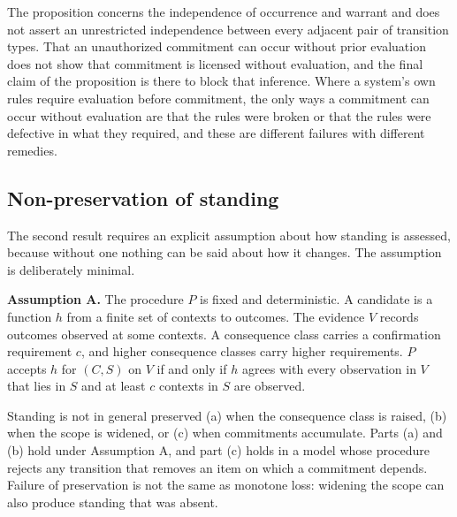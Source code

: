 The proposition concerns the independence of occurrence and warrant and does not assert an unrestricted independence between every adjacent pair of transition types. That an unauthorized commitment can occur without prior evaluation does not show that commitment is licensed without evaluation, and the final claim of the proposition is there to block that inference. Where a system's own rules require evaluation before commitment, the only ways a commitment can occur without evaluation are that the rules were broken or that the rules were defective in what they required, and these are different failures with different remedies.

\subsection*{Non-preservation of standing}

The second result requires an explicit assumption about how standing is assessed, because without one nothing can be said about how it changes. The assumption is deliberately minimal.

\medskip
\noindent\textbf{Assumption A.} The procedure $P$ is fixed and deterministic. A candidate is a function $h$ from a finite set of contexts to outcomes. The evidence $V$ records outcomes observed at some contexts. A consequence class carries a confirmation requirement $c$, and higher consequence classes carry higher requirements. $P$ accepts $h$ for $(C,S)$ on $V$ if and only if $h$ agrees with every observation in $V$ that lies in $S$ and at least $c$ contexts in $S$ are observed.
\medskip

\begin{proposition}\label{prop:two}
Standing is not in general preserved (a) when the consequence class is raised, (b) when the scope is widened, or (c) when commitments accumulate. Parts (a) and (b) hold under Assumption A, and part (c) holds in a model whose procedure rejects any transition that removes an item on which a commitment depends. Failure of preservation is not the same as monotone loss: widening the scope can also produce standing that was absent.
\end{proposition}

